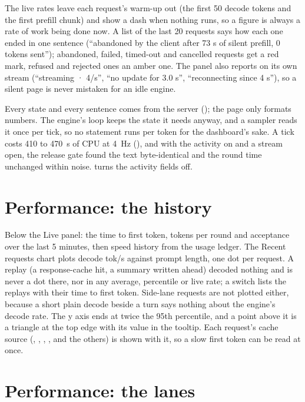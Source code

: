 The live rates leave each request's warm-up out (the first 50 decode tokens and the first prefill chunk) and show a dash when nothing runs, so a figure is always a rate of work being done now. A list of the last 20 requests says how each one ended in one sentence (\enquote{abandoned by the client after 73 s of silent prefill, 0 tokens sent}); abandoned, failed, timed-out and cancelled requests get a red mark, refused and rejected ones an amber one. The panel also reports on its own stream (\enquote{streaming · 4/s}, \enquote{no update for 3.0 s}, \enquote{reconnecting since 4 s}), so a silent page is never mistaken for an idle engine.

Every state and every sentence comes from the server (); the page only formats numbers. The engine's loop keeps the state it needs anyway, and a sampler reads it once per tick, so no statement runs per token for the dashboard's sake. A tick costs 410 to 470~\textmu s of CPU at 4~Hz (\measured), and with the activity on and a stream open, the release gate found the text byte-identical and the round time unchanged within noise.  turns the activity fields off.

\section{Performance: the history}

Below the Live panel: the time to first token, tokens per round and acceptance over the last 5 minutes, then speed history from the usage ledger. The Recent requests chart plots decode tok/s against prompt length, one dot per request. A replay (a response-cache hit, a summary written ahead) decoded nothing and is never a dot there, nor in any average, percentile or live rate; a switch lists the replays with their time to first token. Side-lane requests are not plotted either, because a short plain decode beside a turn says nothing about the engine's decode rate. The y axis ends at twice the 95th percentile, and a point above it is a triangle at the top edge with its value in the tooltip. Each request's cache source (, , , ,  and the others) is shown with it, so a slow first token can be read at once.

\section{Performance: the lanes}\label{sec:dash-lanes}

